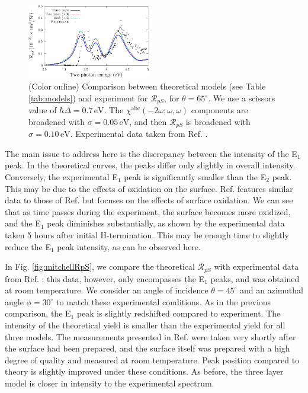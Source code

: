 \documentclass[prb,superscriptaddress,showpacs,twocolumn,letterpaper]{revtex4}
\begin{document}
\begin{figure}[b]
\centering
\includegraphics[width=0.48\textwidth]{fig3}
\caption{(Color online) Comparison between theoretical models (see Table
\ref{tab:models}) and experiment for $\mathcal{R}_{pS}$, for
$\theta=65^{\circ}$. We use a scissors value of $\hbar\Delta = 0.7\,\text{eV}$.
The $\chi^{\mathrm{abc}}(-2\omega;\omega,\omega)$ components are broadened with
$\sigma=0.05\,\text{eV}$, and then $\mathcal{R}_{pS}$ is broadened with
$\sigma=0.10\,\text{eV}$. Experimental data taken from Ref.
.\label{fig:RpS}}
\end{figure}

The main issue to address here is the discrepancy between the intensity of the
E$_{1}$ peak. In the theoretical curves, the peaks differ only slightly in
overall intensity. Conversely, the experimental E$_{1}$ peak is significantly
smaller than the E$_{2}$ peak. This may be due to the effects of oxidation on
the surface. Ref.  features similar data to those of
Ref.  but focuses on the effects of surface oxidation. We
can see that as time passes during the experiment, the surface becomes more
oxidized, and the E$_{1}$ peak diminishes substantially, as shown by the
experimental data taken 5 hours after initial H-termination. This may be enough
time to slightly reduce the E$_{1}$ peak intensity, as can be observed here.

In Fig. \ref{fig:mitchellRpS}, we compare the theoretical $\mathcal{R}_{pS}$
with experimental data from Ref. ; this data, however,
only encompasses the E$_{1}$ peaks, and was obtained at room temperature. We
consider an angle of incidence $\theta=45^\circ$ and an azimuthal angle
$\phi=30^\circ$ to match these experimental conditions. As in the previous
comparison, the E$_{1}$ peak is slightly redshifted compared to experiment. The
intensity of the theoretical yield is smaller than the experimental yield for
all three models. The measurements presented in Ref. 
were taken very shortly after the surface had been prepared, and the surface
itself was prepared with a high degree of quality and measured at room
temperature. Peak position compared to theory is slightly improved under these
conditions. As before, the three layer model is closer in intensity to the
experimental spectrum.
\end{document}
